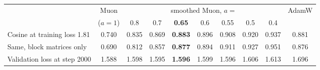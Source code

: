 \begin{tabular}{@{}l|c|ccccccc|c@{}}
 & Muon & \multicolumn{7}{c|}{smoothed Muon, $a=$} & AdamW \\
 & ($a=1$) & 0.8 & 0.7 & \textbf{0.65} & 0.6 & 0.55 & 0.5 & 0.4 & \\
\hline
Cosine at training loss 1.81 & 0.740 & 0.835 & 0.869 & \textbf{0.883} & 0.896 & 0.908 & 0.920 & 0.937 & 0.881 \\
Same, block matrices only & 0.690 & 0.812 & 0.857 & \textbf{0.877} & 0.894 & 0.911 & 0.927 & 0.951 & 0.876 \\
Validation loss at step 2000 & 1.588 & 1.598 & 1.595 & \textbf{1.596} & 1.599 & 1.596 & 1.606 & 1.613 & 1.696 \\
\hline
\end{tabular}
